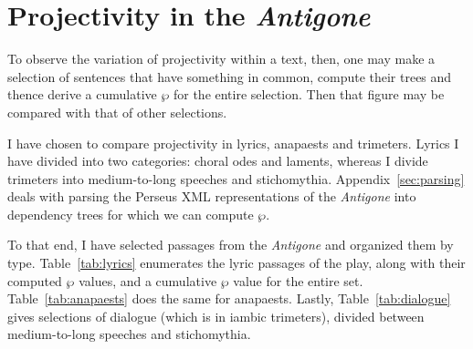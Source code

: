\documentclass[letterpaper, 11pt]{article}
\newcommand{\FN}{\mathsf}
\begin{document}
\section{Projectivity in the \emph{Antigone}}

To observe the variation of projectivity within a text, then, one may make a
selection of sentences that have something in common, compute their trees and
thence derive a cumulative \ensuremath{\FN{\wp}} for the entire selection. Then that figure
may be compared with that of other selections.

I have chosen to compare projectivity in lyrics, anapaests and trimeters. Lyrics
I have divided into two categories: choral odes and laments, whereas I divide
trimeters into medium-to-long speeches and stichomythia.
Appendix~\ref{sec:parsing} deals with parsing the Perseus XML representations of
the \emph{Antigone} into dependency trees for which we can compute \ensuremath{\FN{\wp}}.

To that end, I have selected passages from the \emph{Antigone} and organized
them by type. Table~\ref{tab:lyrics} enumerates the lyric passages of the play,
along with their computed \ensuremath{\FN{\wp}} values, and a cumulative \ensuremath{\FN{\wp}} value for the
entire set. Table~\ref{tab:anapaests} does the same for anapaests. Lastly,
Table~\ref{tab:dialogue} gives selections of dialogue (which is in iambic
trimeters), divided between medium-to-long speeches and stichomythia.
\end{document}
